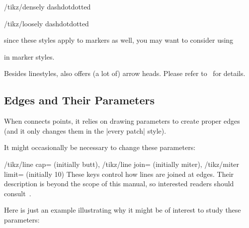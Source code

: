 \begin{stylekey}{/tikz/densely dashdotdotted}
\end{stylekey}

\begin{stylekey}{/tikz/loosely dashdotdotted}
\end{stylekey}
%
\noindent since these styles apply to markers as well, you may want to consider
using
%
\begin{codeexample}
\end{codeexample}
%
\noindent in marker styles.

Besides linestyles, \PGF{} also offers (a lot of) arrow heads. Please refer
to~\cite{tikz} for details.
%
\endgroup


\subsection{Edges and Their Parameters}

When \PGFPlots{} connects points, it relies on \PGF{} drawing parameters to
create proper edges (and it only changes them in the |every patch| style).

It might occasionally be necessary to change these parameters:

\begin{keylist}{
    /tikz/line cap= (initially butt),
    /tikz/line join= (initially miter),
    /tikz/miter limit= (initially 10)%
}
    These keys control how lines are joined at edges. Their description is
    beyond the scope of this manual, so interested readers should
    consult~\cite{tikz}.

    Here is just an example illustrating why it might be of interest to study
    these parameters:
\begin{codeexample}[]
\end{codeexample}
\end{keylist}


